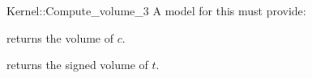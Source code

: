 \begin{ccRefFunctionObjectConcept}{Kernel::Compute_volume_3}
A model for this must provide:


       {returns the volume of $c$. }

       {returns the signed volume of $t$. }

\ccIsModel{}

\end{ccRefFunctionObjectConcept}
